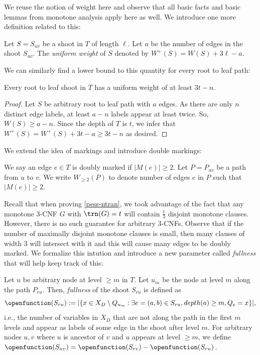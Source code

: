 We reuse the notion of weight here and observe that all basic facts and basic lemmas from monotone analysis apply here as well. We introduce one more definition related to this:

\begin{definition}
Let $S = S_{uv}$ be a shoot in $T$ of length $\ell$. 
Let $a$ be the number of edges in the shoot $S_{uv}$.
The \emph{uniform weight} of $S$ denoted by $W^{+}(S) = W(S) + 3\ell - a$.
\end{definition}

We can similarly find a lower bound to this quantity for every root to leaf path:

\begin{fact}
\label{fact:shoot-uniform-extended-weight-lower-bound}
Every root to leaf shoot in $T$ has a uniform weight of
at least $3t - n$.
\end{fact}

\begin{proof}
Let $S$ be arbitrary root to leaf path with $a$ edges.
As there are only $n$ distinct edge labels, at least $a-n$ labels appear at least twice. So, $W(S) \ge a - n$.
Since the depth of $T$ is $t$, we infer that $W^{+}(S) = W^+(S) + 3t - a \ge 3t - n$ as desired.
\end{proof}

We extend the idea of markings and introduce double markings:

\begin{definition}
We say an edge $e\in T$ is doubly marked if $|M(e)| \ge 2$.
Let $P = P_{uv}$ be a path from $u$ to $v$. We write $W_{\ge 2}(P)$ to denote number of edges $e$ in $P$ such that $|M(e)| \ge 2$.
\end{definition}


Recall that when proving \cref{pess-ntran}, we took advantage of the fact that any monotone $3$-CNF $G$ with $\trn(G) = t$ will contain $\frac{t}{3}$ disjoint monotone clauses. However, there is no such guarantee for arbitrary $3$-CNFs. Observe that if the number of maximally disjoint monotone clauses is small, then many clauses of width $3$ will intersect with it and this will cause many edges to be doubly marked. We formalize this intution and introduce a new parameter called \emph{fullness} that will help keep track of this:

\begin{definition}[Fullness]
Let $u$ be arbitrary node at level $\ge m$ in $T$. Let $u_m$ be the node at level $m$ along the path $P_{ru}$. Then, \emph{fullness} of the shoot $S_{ru}$ is defined as
\[
\openfunction(S_{ru}) := |\{x\in X_D\setminus Q_{u_m}: \exists e = (a, b)\in S_{ru}, depth(a) \ge m, Q_e = x\}|,
\]
i.e., the number of variables in $X_D$ that are not along the path in the first $m$ levels and appear as labels of some edge in the shoot after level $m$. For arbitrary nodes $u, v$ where $u$ is ancestor of $v$ and $u$ appears at level $\ge m$, we define $\openfunction(S_{uv}) = \openfunction(S_{rv}) - \openfunction(S_{ru})$.
\end{definition}

